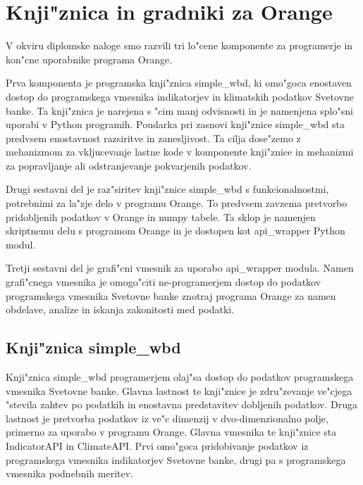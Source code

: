 
\chapter{Knji"znica in gradniki za Orange}

V okviru diplomske naloge smo razvili tri lo"cene komponente za programerje in
kon"cne uporabnike programa Orange. 

Prva komponenta je programska knji"znica simple\_wbd, ki
omo"goca enostaven dostop do programskega vmesnika indikatorjev in klimatskih
podatkov Svetovne banke. Ta knji"znica je narejena s "cim manj odvisnosti in je 
namenjena splo"sni uporabi v Python programih. Poudarka pri zasnovi knji"znice 
simple\_wbd sta predvsem enostavnost razsiritve in zanesljivost. Ta cilja
dose"zemo z mehanizmom za vkljucevanje lastne kode v komponente knji"znice
in mehanizmi za popravljanje ali odstranjevanje pokvarjenih podatkov.

Drugi sestavni del je raz"siritev knji"znice simple\_wbd s funkcionalnostmi, 
potrebnimi za la"zje delo v programu Orange. To predvsem zavzema pretvorbo
pridobljenih podatkov v Orange in numpy tabele. Ta sklop je namenjen skriptnemu
delu s programom Orange in je dostopen kot api\_wrapper Python modul. 

Tretji sestavni del je grafi"cni vmesnik za uporabo api\_wrapper modula. Namen
grafi"cnega vmesnika je omogo"citi ne-programerjem dostop do podatkov 
programskega vmesnika Svetovne banke znotraj programa Orange za namen obdelave,
analize in iskanja zakonitosti med podatki.

\section{Knji"znica simple\_wbd}

Knji"znica simple\_wbd programerjem olaj"sa dostop do podatkov programskega 
vmesnika Svetovne banke. Glavna lastnost te knji"znice je zdru"zevanje ve"cjega 
"stevila zahtev po podatkih in enostavna predstavitev dobljenih podatkov. 
Druga lastnost je pretvorba podatkov iz ve"c dimenzij v dvo-dimenzionalno polje,
primerno za uporabo v programu Orange. Glavna vmesnika te knji"znice sta 
IndicatorAPI in ClimateAPI. Prvi omo"goca pridobivanje podatkov iz programskega 
vmesnika indikatorjev Svetovne banke, drugi pa s programskega vmesnika
podnebnih meritev.





